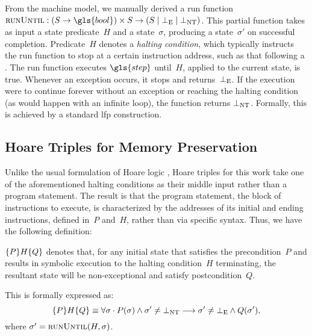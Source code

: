 From the machine model, we manually derived a run function%
$\run:(S\rightarrow\gls{bool})\times S\rightarrow(S\mid\err\mid\infloop)$.
This partial function takes as input a state predicate~$H$ and a state~$\sigma$,%
producing a state~$\sigma'$ on successful completion.
Predicate~$H$ denotes a \emph{halting condition},%
which typically instructs the run function to stop
at a certain instruction address, such as that following a .
The run function executes $\gls{step}$ until~$H$, applied to the current state,
is true. Whenever an exception occurs, it stops and returns~$\bot_\mathrm{E}$.
If the execution were to continue forever
without an exception or reaching the halting condition
(as would happen with an infinite loop), the function returns $\bot_\mathrm{NT}$.
Formally, this is achieved by a standard \ac{lfp} construction.

\subsection{Hoare Triples for Memory Preservation}
Unlike the usual formulation of
Hoare logic \autocite{hoare1969axiomatic,myreen2007hoare},%
Hoare triples for this work take one of the aforementioned halting conditions%
as their middle input rather than a program statement.
The result is that the program statement,
the block of instructions to execute, is characterized by the addresses of its initial
and ending instructions, defined in~$P$ and~$H$, rather than via specific syntax.
Thus, we have the following definition:
\begin{definition}\label{def:htriple}
  $\{P\}H\{Q\}$
  denotes that, for any initial state that satisfies the precondition~$P$
  and results in symbolic execution to the halting condition~$H$ terminating,
  the resultant state will be non-exceptional and satisfy postcondition~$Q$.

  This is formally expressed as:
  \begin{equation}
  \{P\}H\{Q\}\equiv\forall\sigma\cdot
  P(\sigma)\land\sigma'\neq\bot_\mathrm{NT}\longrightarrow
  \sigma'\neq\bot_\mathrm{E}\land Q(\sigma'),
  \end{equation}
  where $\sigma'=\operatorname{\textsc{runUntil}}(H,\sigma)$.
\end{definition}

